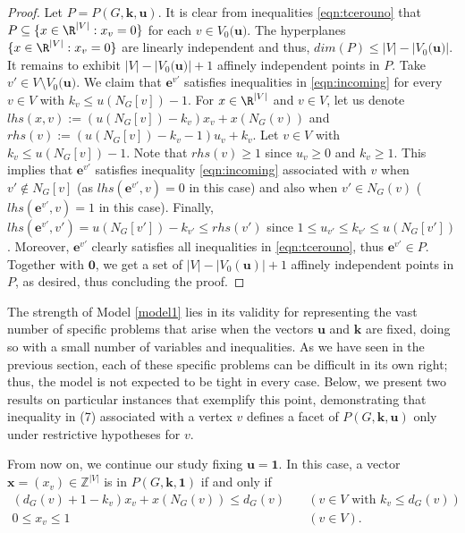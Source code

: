 \documentclass[preprint,12pt]{article}
\renewcommand{\leq}{\leqslant}
\renewcommand{\geq}{\geqslant}
\theoremstyle{definition}
\begin{document}
\begin{proof}
    
    Let $P=P(G,\mathbf{k},\mathbf{u})$. It is clear from inequalities \eqref{eqn:tcerouno} that $P\subseteq\{x\in \R^{|V|}: x_v=0\}$ for each $v\in V_0(\mathbf{u)}$. The hyperplanes $\{x\in \R^{|V|}: x_v=0\}$  are linearly independent and thus, $dim(P)\leq |V|-|V_0(\mathbf{u)}|$. 
        It remains to exhibit $|V|-|V_0(\mathbf{u)}|+1$ affinely independent points in $P$.
        Take $v'\in V\setminus V_0(\mathbf{u)}$. We claim that $\mathbf{e}^{v'}$ satisfies inequalities in \eqref{eqn:incoming} for every $v\in V$ with $k_v\leq u(N_G[v])-1$. 
    For $x\in \R^{|V|}$ and $v\in V$, let us denote  $lhs(x,v):=\left(u(N_G[v])-k_v \right)x_v + x(N_G(v))$ and $rhs(v):= \left(u(N_G[v])-k_v-1\right)u_v+k_v$. 
Let $v\in V$ with $k_v\leq u(N_G[v])-1$. Note that $rhs(v)\geq 1$  since  $u_v\geq 0$ and $k_v\geq 1$. This implies  that $\mathbf{e}^{v'}$ satisfies inequality \eqref{eqn:incoming} associated with $v$ when $v'\notin N_G[v]$ (as $lhs(\mathbf{e}^{v'},v)=0$ in this case) and also when  $v'\in N_G(v)$ ($lhs(\mathbf{e}^{v'},v)=1$ in this case).
Finally, $lhs(\mathbf{e}^{v'},v')=u(N_G[v'])-k_{v'} \leq rhs(v')$ since  $1\leq u_{v'}\leq k_{v'}\leq u(N_G[v'])$. 
Moreover, $\mathbf{e}^{v'}$ clearly satisfies all inequalities in \eqref{eqn:tcerouno}, thus $\mathbf{e}^{v'}\in P$. Together with $\mathbf{0}$, we get a set of $|V|-|V_0(\mathbf{u})|+1$ affinely independent points in $P$, as desired, thus concluding the proof.
    \end{proof}

The strength of Model \ref{model1} lies in its validity for representing the vast number of specific problems that arise when the vectors $\mathbf{u}$ and $\mathbf{k}$ are fixed, doing so with a small number of variables and inequalities. As we have seen in the previous section, each of these specific problems can be difficult in its own right; thus, the model is not expected to be tight in every case. Below, we present two results on particular instances  that exemplify this point, demonstrating that  inequality in (7) associated with a vertex $v$ defines a facet of $P(G,\mathbf{k},\mathbf{u})$ only under restrictive hypotheses for $v$.


 
From now on, we continue our study fixing $\mathbf{u}=\mathbf{1}$. 
In this case,  a vector 
$\mathbf{x}=(x_v)\in \mathbb{Z}^{|V|}$ is in  $P(G,\mathbf{k},\mathbf{1})$ if and only if 
\begin{align}
(d_G(v)+1 - k_v)x_v + x( N_G(v))  \leq d_G(v) &\quad (v\in V\text{ with } k_v\leq d_G(v) ) \label{eqn: vecindad con u=1} \\ 
0\leq x_v \leq 1 \label{eqn:0,1} &\quad (v\in V).\end{align}
\end{document}
